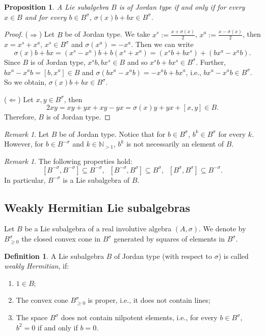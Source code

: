 \documentclass[a4paper,oneside,11pt]{amsart}
\newcommand{\N}{\mathbb N}
\theoremstyle{plain}
\newtheorem{prop}[teo]{Proposition}
\theoremstyle{definition}
\newtheorem{df}[teo]{Definition}
\theoremstyle{remark}
\newtheorem{rem}[teo]{Remark}
\newcommand{\defin}{\emph}
\begin{document}
\begin{prop}\label{prop:JordanType}
A Lie subalgebra $B$ is of Jordan type if and only if for every $x\in B$ and for every $b\in B^{\sigma}$, $\sigma(x)b+bx\in B^{\sigma}$.
\end{prop}

\begin{proof} ($\Rightarrow$) Let $B$ be of Jordan type.
We take $x^s:=\frac{x+\sigma(x)}{2}$, $x^a:=\frac{x-\sigma(x)}{2}$, then $x=x^s+x^a$, $x^s\in B^{\sigma}$ and $\sigma(x^a)=-x^a$. Then we can write
$$\sigma(x)b+bx=(x^s-x^a)b+b(x^s+x^a)=(x^sb+bx^s)+(bx^a-x^ab).$$
Since $B$ is of Jordan type, $x^sb,bx^s\in B$ and so $x^sb+bx^s\in B^{\sigma}$. Further, $bx^a-x^ab=[b,x^a]\in B$ and $\sigma(bx^a-x^ab)=-x^ab+bx^a$, i.e., $bx^a-x^ab\in B^{\sigma}$. So we obtain, $\sigma(x)b+bx\in B^{\sigma}$.

\vspace{2mm}
\noindent ($\Leftarrow$) Let $x,y\in B^\sigma$, then
$$2xy=xy+yx+xy-yx=\sigma(x)y+yx+[x,y]\in B.$$
Therefore, $B$ is of Jordan type.
\end{proof}

\begin{rem}
    Let $B$ be of Jordan type. Notice that for $b\in B^\sigma$, $b^k\in B^\sigma$ for every $k$. However, for $b\in B^{-\sigma}$ and $k\in\N_{>1}$, $b^k$ is not necessarily an element of $B$.
\end{rem}

\begin{rem}
    The following properties hold:
    $$[ B^{-\sigma}, B^{-\sigma} ] \subseteq B^{-\sigma},\;\;[ B^{-\sigma}, B^{\sigma} ] \subseteq B^{\sigma},\;\;[ B^{\sigma}, B^{\sigma} ] \subseteq B^{-\sigma}.$$
    In particular, $B^{-\sigma}$ is a Lie subalgebra of $B$.
\end{rem}


\subsection{Weakly Hermitian Lie subalgebras}
Let $B$ be a Lie subalgebra of a real involutive algebra $(A,\sigma)$. We denote by $B_{\geq 0}^\sigma$ the closed convex cone in $B^\sigma$ generated by squares of elements in $B^\sigma$. 

\begin{df}\label{df:R-wHerm}
A Lie subalgebra $B$ of Jordan type (with respect to $\sigma$) is called \defin{weakly Hermitian}, if:
\begin{enumerate}
\item $1\in B$;
\item The convex cone $B^{\sigma}_{\geq 0}$ is proper, i.e., it does not contain lines;
\item\label{R-no_nilp} The space $B^{\sigma}$ does not contain nilpotent elements, i.e., for every $b\in B^{\sigma}$, $b^2=0$ if and only if $b=0$.
\end{enumerate}
\end{df}
\end{document}
